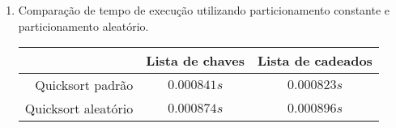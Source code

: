 \documentclass[10pt,a4paper]{article}
\begin{document}
\begin{enumerate}
      \item Comparação de tempo de execução utilizando particionamento constante
      e particionamento aleatório.

        \begin{tabular}{ r | c | c |}
                              & Lista de chaves & Lista de cadeados \\ \hline
          Quicksort padrão    & $0.000841s$     & $0.000823s$       \\ \hline
          Quicksort aleatório & $0.000874s$     & $0.000896s$       \\ \hline
        \end{tabular}

		\end{enumerate}
\end{document}
